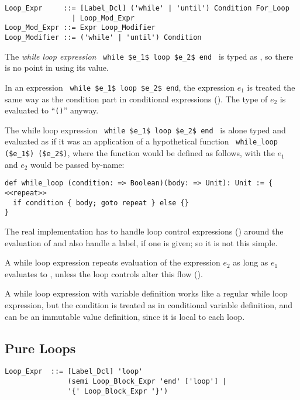 \syntax\begin{lstlisting}
Loop_Expr     ::= [Label_Dcl] ('while' | 'until') Condition For_Loop
                | Loop_Mod_Expr
Loop_Mod_Expr ::= Expr Loop_Modifier
Loop_Modifier ::= ('while' | 'until') Condition
\end{lstlisting}

The {\em while loop expression} ~\lstinline!while $e_1$ loop $e_2$ end!~ is typed as , so there is no point in using its value. 

In an expression ~\lstinline!while $e_1$ loop $e_2$ end!, the expression $e_1$ is treated the same way as the condition part in conditional expressions (). The type of $e_2$ is evaluated to ``\lstinline!()!'' anyway.

The while loop expression ~\lstinline!while $e_1$ loop $e_2$ end!~ is alone typed and evaluated as if it was an application of a hypothetical function ~\lstinline!while_loop ($e_1$) ($e_2$)!, where the function  would be defined as follows, with the $e_1$ and $e_2$ would be passed by-name: 
\begin{lstlisting}
def while_loop (condition: => Boolean)(body: => Unit): Unit := {
<<repeat>>
  if condition { body; goto repeat } else {}
}
\end{lstlisting}
The real implementation has to handle loop control expressions () around the evaluation of  and also handle a label, if one is given; so it is not this simple. 

A while loop expression repeats evaluation of the expression $e_2$ as long as $e_1$ evaluates to , unless the loop controls alter this flow ().

A while loop expression with variable definition works like a regular while loop expression, but the condition is treated as in conditional variable definition, and can be an immutable value definition, since it is local to each loop. 





\subsection{Pure Loops}
\label{sec:pure-loops}

\syntax\begin{lstlisting}
Loop_Expr  ::= [Label_Dcl] 'loop'
               (semi Loop_Block_Expr 'end' ['loop'] | 
               '{' Loop_Block_Expr '}')
\end{lstlisting}

